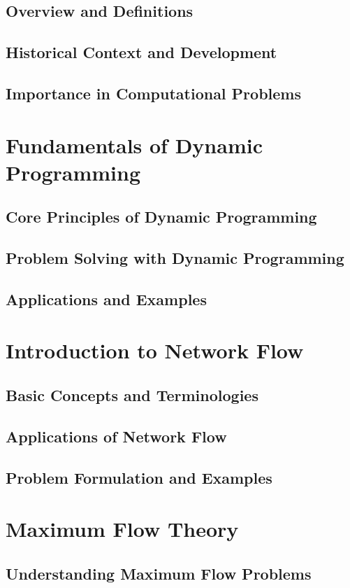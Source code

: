 \documentclass[12pt]{book} %
\begin{document}
\subsection{Overview and Definitions}
\subsection{Historical Context and Development}
\subsection{Importance in Computational Problems}

\section{Fundamentals of Dynamic Programming}
\subsection{Core Principles of Dynamic Programming}
\subsection{Problem Solving with Dynamic Programming}
\subsection{Applications and Examples}

\section{Introduction to Network Flow}
\subsection{Basic Concepts and Terminologies}
\subsection{Applications of Network Flow}
\subsection{Problem Formulation and Examples}

\section{Maximum Flow Theory}
\subsection{Understanding Maximum Flow Problems}
\end{document}
